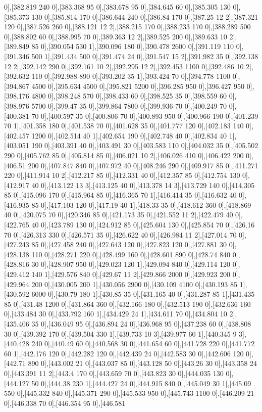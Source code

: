 {0],[382.819 240 0],[383.368 95 0],[383.678 95 0],[384.645 60 0],[385.305 130 0],[385.373 130 0],[385.814 170 0],[386.644 240 0],[386.84 170 0],[387.25 12 2],[387.321 120 0],[387.526 260 0],[388.121 12 2],[388.215 170 0],[388.233 170 0],[388.289 500 0],[388.802 60 0],[388.995 70 0],[389.363 12 2],[389.525 200 0],[389.633 10 2],[389.849 85 0],[390.054 530 1],[390.096 180 0],[390.478 2600 0],[391.119 110 0],[391.346 500 1],[391.434 500 0],[391.474 24 0],[391.547 15 2],[391.982 35 0],[392.138 12 2],[392.142 290 0],[392.161 10 2],[392.295 12 2],[392.453 1100 0],[392.486 10 2],[392.632 110 0],[392.988 890 0],[393.202 35 1],[393.424 70 0],[394.778 1100 0],[394.867 4500 0],[395.634 4500 0],[395.821 5200 0],[396.285 950 0],[396.427 950 0],[398.176 4800 0],[398.248 570 0],[398.433 60 0],[398.525 35 0],[398.559 60 0],[398.976 5700 0],[399.47 35 0],[399.864 7800 0],[399.936 70 0],[400.249 70 0],[400.381 70 0],[400.597 35 0],[400.806 70 0],[400.893 950 0],[400.966 190 0],[401.239 70 1],[401.358 180 0],[401.538 70 0],[401.628 35 0],[401.777 120 0],[402.183 140 0],[402.457 1200 0],[402.514 40 1],[402.654 190 0],[402.748 40 0],[402.834 40 1],[403.051 190 0],[403.391 40 0],[403.491 30 0],[403.583 110 0],[404.032 35 0],[405.502 290 0],[405.762 85 0],[405.814 85 0],[406.021 10 2],[406.026 410 0],[406.422 200 0],[406.51 200 0],[407.847 840 0],[407.972 40 0],[408.246 290 0],[409.917 85 0],[411.271 220 0],[411.914 10 2],[412.217 85 0],[412.331 40 0],[412.357 85 0],[412.754 130 0],[412.917 40 0],[413.122 13 3],[413.125 40 0],[413.378 14 3],[413.729 140 0],[414.305 85 0],[415.096 170 0],[415.964 85 0],[416.365 70 1],[416.414 35 0],[416.632 40 0],[416.935 85 0],[417.103 120 0],[417.19 40 1],[418.33 35 0],[418.612 360 0],[418.869 40 0],[420.075 70 0],[420.346 85 0],[421.173 35 0],[421.552 11 2],[422.479 40 0],[422.765 40 0],[423.789 130 0],[424.912 85 0],[425.604 130 0],[425.854 70 0],[426.16 70 0],[426.313 330 0],[426.571 35 0],[426.622 40 0],[426.984 11 2],[427.014 70 0],[427.243 85 0],[427.458 240 0],[427.643 120 0],[427.823 120 0],[427.881 30 0],[428.138 110 0],[428.271 220 0],[428.499 160 0],[428.601 890 0],[428.74 840 0],[428.816 30 0],[428.907 950 0],[429.023 120 1],[429.094 840 0],[429.114 120 0],[429.412 140 1],[429.576 840 0],[429.67 11 2],[429.866 2000 0],[429.923 200 0],[429.964 200 0],[430.005 200 1],[430.056 2900 0],[430.109 4100 0],[430.193 85 1],[430.592 6000 0],[430.79 180 1],[430.85 35 0],[431.165 40 0],[431.287 85 1],[431.435 85 0],[431.48 1200 0],[431.864 360 0],[432.166 180 0],[432.513 190 0],[432.636 160 0],[433.484 30 0],[433.792 160 1],[434.429 24 1],[434.611 70 0],[434.804 10 2],[435.406 35 0],[436.049 95 0],[436.894 24 0],[436.968 95 0],[437.238 60 0],[438.808 30 0],[439.392 170 0],[439.504 330 1],[439.733 10 3],[439.977 60 1],[440.345 9 3],[440.428 240 0],[440.49 60 0],[440.568 30 0],[441.654 60 0],[441.728 220 0],[441.772 60 1],[442.176 120 0],[442.282 120 0],[442.439 24 0],[442.583 30 0],[442.606 120 0],[442.71 890 0],[443.002 21 0],[443.037 85 0],[443.128 50 0],[443.26 30 0],[443.358 24 0],[443.391 11 2],[443.4 170 0],[443.659 70 0],[443.823 30 0],[444.035 130 0],[444.127 50 0],[444.38 230 1],[444.427 24 0],[444.915 840 0],[445.049 30 1],[445.09 550 0],[445.332 840 0],[445.371 290 0],[445.533 950 0],[445.743 1100 0],[446.209 21 0],[446.338 70 0],[446.354 95 0],[446.581 }

